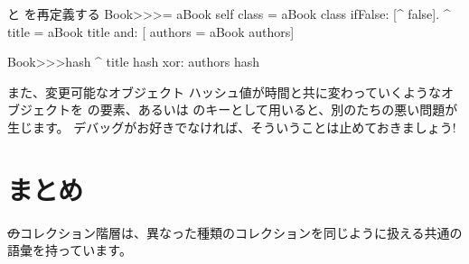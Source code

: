 \documentclass[a4paper,10pt,twoside]{book}
\begin{document}
\begin{method}{\lct{=} と  を再定義する}
Book>>>= aBook
   self class = aBook class ifFalse: [^ false].
   ^ title = aBook title and: [ authors = aBook authors]

Book>>>hash 
   ^ title hash xor: authors hash
\end{method}

また、変更可能なオブジェクト \ie ハッシュ値が時間と共に変わっていくようなオブジェクトを  の要素、あるいは  のキーとして用いると、別のたちの悪い問題が生じます。
デバッグがお好きでなければ、そういうことは止めておきましょう!

\section{まとめ}

\st のコレクション階層は、異なった種類のコレクションを同じように扱える共通の語彙を持っています。%
\end{document}
